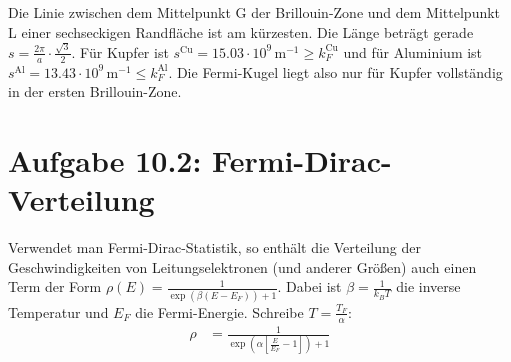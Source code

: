 \documentclass[a4paper,12pt]{article}
\newcommand{\kla}{}
\newcommand{\klam}{}
\newcommand{\tecxt}{}
\begin{document}
Die Linie zwischen dem Mittelpunkt G der Brillouin-Zone und dem Mittelpunkt L einer sechseckigen Randfläche ist am kürzesten. Die Länge beträgt gerade $s=\frac{2\pi}{a}\cdot \frac{\sqrt{3}}{2}$. Für Kupfer ist $s^\tecxt\text{Cu}=15.03\cdot 10^9\,\tecxt\text{m}^{-1}\ge k_F^\tecxt\text{Cu}$ und für Aluminium ist $s^\tecxt\text{Al}=13.43\cdot 10^9\,\tecxt\text{m}^{-1}\le k_F^\tecxt\text{Al}$. Die Fermi-Kugel liegt also nur für Kupfer vollständig in der ersten Brillouin-Zone.
\section*{Aufgabe 10.2: Fermi-Dirac-Verteilung}
Verwendet man Fermi-Dirac-Statistik, so enthält die Verteilung der Geschwindigkeiten von Leitungselektronen (und anderer Größen) auch einen Term der Form $\rho(E)=\frac{1}{\exp\kla\left( {\beta (E-E_F)} \right)+1}$. Dabei ist $\beta=\frac{1}{k_BT}$ die inverse Temperatur und $E_F$ die Fermi-Energie. Schreibe $T=\frac{T_F}{\alpha} $:
\begin{align*}
\rho&=\frac{1}{\exp\kla\left( {\alpha\klam\left[ {\frac{E}{E_F}-1} \right]} \right)+1}
\end{align*}
\end{document}
